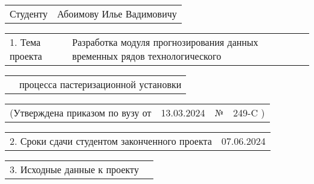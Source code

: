 \documentclass[12pt, А4, twoside]{article}
\begin{document}
\begin{FlushLeft}
\fontsize{12}{0}

    \begin{tabular}{p{1.9cm} p{14.95cm}}
        \textsf{Студенту} &
        \textsf{Абоимову Илье Вадимовичу} \vspace{0pt} \hline
    \end{tabular}

    \vspace{-0.1 cm}

    \begin{tabular}{p{2.8cm} p{14.05cm}}
        \textsf{1. Тема проекта} &
        \textsf{Разработка модуля прогнозирования данных временных рядов технологического} \vspace{0pt} \hline
    \end{tabular}

    \vspace{-0.1 cm}

    \begin{tabular}{p{2.8cm} p{14.05cm}}
        & \textsf{процесса пастеризационной установки} \vspace{0pt} \hline
    \end{tabular}

    \vspace{-0.1 cm}

    \begin{tabular}{p{5.9cm} p{4.8cm} p{0.3cm} p{5.0cm}}
        \textsf{(Утверждена приказом по вузу от} &
        \centering \textsf{13.03.2024} \vspace{1pt} \hline &
        \centering \textsf{№} &
        \centering \textsf{249-C \hspace{0.5cm} )} \hline
    \end{tabular}

    \vspace{-0.1 cm}

    \begin{tabular}{p{9.4cm} p{7.45cm}}
        \textsf{2. Сроки сдачи студентом законченного проекта} &
        \centering \textsf{07.06.2024} \vspace{1pt} \hline
    \end{tabular}

    \vspace{-0.1 cm}

    \begin{tabular}{p{5.7cm} p{11.15cm}}
        \textsf{3. Исходные данные к проекту} &
        \vspace{1pt} \hline
    \end{tabular}


\end{FlushLeft}
\end{document}
